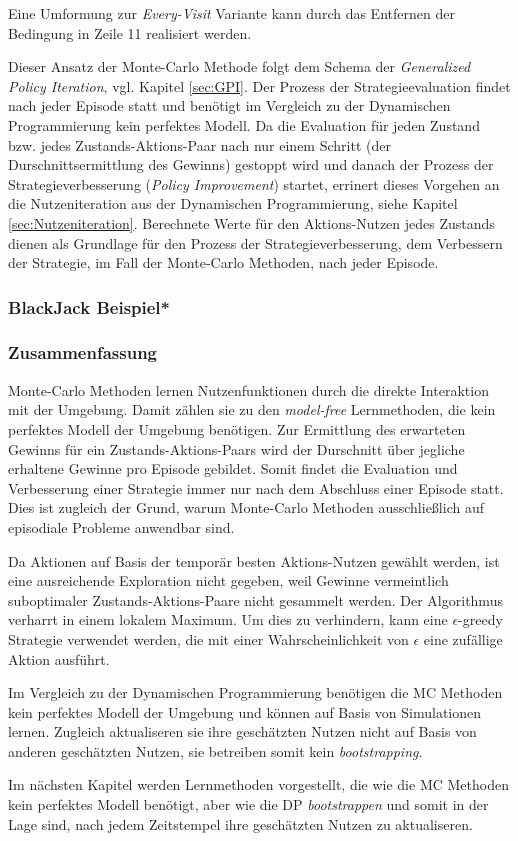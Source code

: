 Eine Umformung zur \textit{Every-Visit} Variante kann durch das Entfernen der Bedingung in Zeile 11 realisiert werden.
\par 
Dieser Ansatz der Monte-Carlo Methode folgt dem Schema der \textit{Generalized Policy Iteration}, vgl. Kapitel \ref{sec:GPI}. Der Prozess der Strategieevaluation findet nach jeder Episode statt und benötigt im Vergleich zu der Dynamischen Programmierung kein perfektes Modell. Da die Evaluation für jeden Zustand bzw. jedes Zustands-Aktions-Paar nach nur einem Schritt (der Durschnittsermittlung des Gewinns) gestoppt wird und danach der Prozess der Strategieverbesserung (\textit{Policy Improvement}) startet, errinert dieses Vorgehen an die Nutzeniteration aus der Dynamischen Programmierung, siehe Kapitel \ref{sec:Nutzeniteration}.  Berechnete Werte für den Aktions-Nutzen jedes Zustands dienen als Grundlage für den Prozess der Strategieverbesserung, dem Verbessern der Strategie, im Fall der Monte-Carlo Methoden, nach jeder Episode.
\subsubsection{BlackJack Beispiel*}

\subsubsection{Zusammenfassung}
Monte-Carlo Methoden lernen Nutzenfunktionen durch die direkte Interaktion mit der Umgebung. Damit zählen sie zu den \textit{model-free} Lernmethoden, die kein perfektes Modell der Umgebung benötigen. Zur Ermittlung des erwarteten Gewinns für ein Zustands-Aktions-Paars wird der Durschnitt über jegliche erhaltene Gewinne pro Episode gebildet. Somit findet die Evaluation und Verbesserung einer Strategie immer nur nach dem Abschluss einer Episode statt. Dies ist zugleich der Grund, warum Monte-Carlo Methoden ausschließlich auf episodiale Probleme anwendbar sind.
\par 
Da Aktionen auf Basis der temporär besten Aktions-Nutzen gewählt werden, ist eine ausreichende Exploration nicht gegeben, weil Gewinne vermeintlich suboptimaler Zustands-Aktions-Paare nicht gesammelt werden. Der Algorithmus verharrt in einem lokalem Maximum. Um dies zu verhindern, kann eine $\epsilon$-greedy Strategie verwendet werden, die mit einer Wahrscheinlichkeit von $\epsilon$ eine zufällige Aktion ausführt.
\par 
Im Vergleich zu der Dynamischen Programmierung benötigen die MC Methoden kein perfektes Modell der Umgebung und können auf Basis von Simulationen lernen. Zugleich aktualiseren sie ihre geschätzten Nutzen nicht auf Basis von anderen geschätzten Nutzen, sie betreiben somit kein \textit{bootstrapping}. 
\par 
Im nächsten Kapitel werden Lernmethoden vorgestellt, die wie die MC Methoden kein perfektes Modell benötigt, aber wie die DP \textit{bootstrappen} und somit in der Lage sind, nach jedem Zeitstempel ihre geschätzten Nutzen zu aktualiseren.